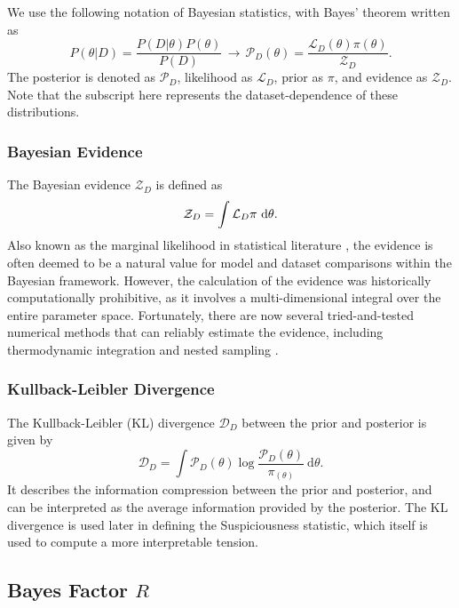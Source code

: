 \documentclass[%
 reprint,
 amsmath,amssymb,
 aps,
]{revtex4-2}
\begin{document}
We use the following notation of Bayesian statistics, with Bayes' theorem written as
\begin{equation}
    P(\theta|D) = \frac{P(D|\theta)P(\theta)}{P(D)} \, \longrightarrow \, \mathcal{P}_D(\theta) = \frac{\mathcal{L}_D(\theta) \pi(\theta)}{\mathcal{Z}_D}.
\end{equation}
The posterior is denoted as $\mathcal{P}_D$, likelihood as $\mathcal{L}_D$, prior as $\pi$, and evidence as $\mathcal{Z}_D$. Note that the subscript here represents the dataset-dependence of these distributions. 

\subsubsection{Bayesian Evidence}
The Bayesian evidence $\mathcal{Z}_D$ is defined as 
\begin{equation}
    \mathcal{Z}_D = \int \mathcal{L}_D \pi \ \rm{d} \theta.
\end{equation}
Also known as the marginal likelihood in statistical literature \cite{Trotta2008}, the evidence is often deemed to be a natural value for model and dataset comparisons within the Bayesian framework. However, the calculation of the evidence was historically computationally prohibitive, as it involves a multi-dimensional integral over the entire parameter space. Fortunately, there are now several tried-and-tested numerical methods that can reliably estimate the evidence, including thermodynamic integration \cite{Lartillot2006} and nested sampling \cite{Skilling2006, Handley2015}.

\subsubsection{Kullback-Leibler Divergence}

The Kullback-Leibler (KL) divergence $\mathcal{D}_D$ between the prior and posterior is given by
\begin{equation}
    \mathcal{D}_D = \int \mathcal{P}_D (\theta) \log \frac{\mathcal{P}_D (\theta)}{\pi_(\theta)} \ \textrm{d}\theta.
\end{equation}
It describes the information compression between the prior and posterior, and can be interpreted as the average information provided by the posterior. The KL divergence is used later in defining the Suspiciousness statistic, which itself is used to compute a more interpretable tension.

\subsection{Bayes Factor $R$}
\end{document}
